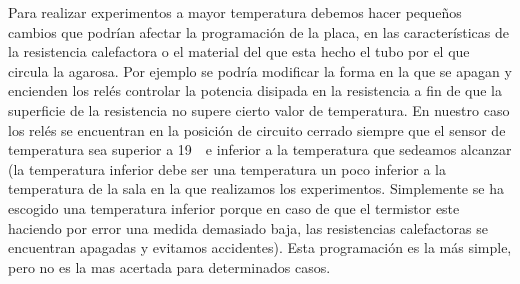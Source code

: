 Para realizar experimentos a mayor temperatura debemos hacer pequeños cambios que podrían afectar la programación de la placa, en las características de la resistencia calefactora o el material del que esta hecho el tubo por el que circula la agarosa. Por ejemplo se podría modificar la forma en la que se apagan y encienden los relés controlar la potencia disipada en la resistencia a fin de que la superficie de la resistencia no supere cierto valor de temperatura. En nuestro caso los relés se encuentran en la posición de circuito cerrado siempre que el sensor de temperatura sea superior a 19~\celsius\ e inferior a la temperatura que sedeamos alcanzar (la temperatura inferior debe ser una temperatura un poco inferior a la temperatura de la sala en la que realizamos los experimentos. Simplemente se ha escogido una temperatura inferior porque en caso de que el termistor este haciendo por error una medida demasiado baja, las resistencias calefactoras se encuentran apagadas y evitamos accidentes). Esta programación es la más simple, pero no es la mas acertada para determinados casos.


